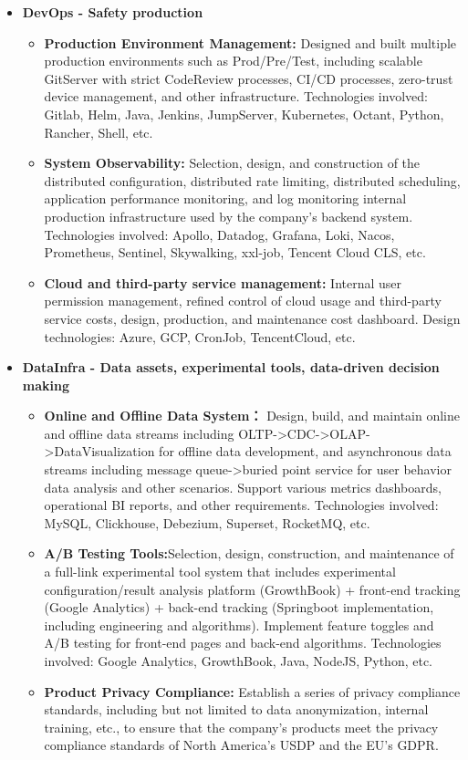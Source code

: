 \documentclass[letterpaper,11pt]{article}
\begin{document}
\begin{spacing}{1.0}
\begin{itemize}
\begin{itemize}
			\item \textbf{DevOps - Safety production}
			\begin{itemize}
				\item \textbf{Production Environment Management: }Designed and built multiple production environments such as Prod/Pre/Test, including scalable GitServer with strict CodeReview processes, CI/CD processes, zero-trust device management, and other infrastructure. Technologies involved: Gitlab, Helm, Java, Jenkins, JumpServer, Kubernetes, Octant, Python, Rancher, Shell, etc.
				\item \textbf{System Observability: }Selection, design, and construction of the distributed configuration, distributed rate limiting, distributed scheduling, application performance monitoring, and log monitoring internal production infrastructure used by the company's backend system. Technologies involved: Apollo, Datadog, Grafana, Loki, Nacos, Prometheus, Sentinel, Skywalking, xxl-job, Tencent Cloud CLS, etc.
				\item \textbf{Cloud and third-party service management: }Internal user permission management, refined control of cloud usage and third-party service costs, design, production, and maintenance cost dashboard. Design technologies: Azure, GCP, CronJob, TencentCloud, etc.
			\end{itemize}
			
			\item \textbf{DataInfra - Data assets, experimental tools, data-driven decision making}
			\begin{itemize}
				\item
				\textbf{Online and Offline Data System： }Design, build, and maintain online and offline data streams including OLTP->CDC->OLAP->DataVisualization for offline data development, and asynchronous data streams including message queue->buried point service for user behavior data analysis and other scenarios. Support various metrics dashboards, operational BI reports, and other requirements. Technologies involved: MySQL, Clickhouse, Debezium, Superset, RocketMQ, etc.
				\item
				\textbf{A/B Testing Tools:}Selection, design, construction, and maintenance of a full-link experimental tool system that includes experimental configuration/result analysis platform (GrowthBook) + front-end tracking (Google Analytics) + back-end tracking (Springboot implementation, including engineering and algorithms). Implement feature toggles and A/B testing for front-end pages and back-end algorithms. Technologies involved: Google Analytics, GrowthBook, Java, NodeJS, Python, etc.
				\item
				\textbf{Product Privacy Compliance: }Establish a series of privacy compliance standards, including but not limited to data anonymization, internal training, etc., to ensure that the company's products meet the privacy compliance standards of North America's USDP and the EU's GDPR.
			\end{itemize}
			

\end{itemize}
\end{itemize}
\end{spacing}
\end{document}
